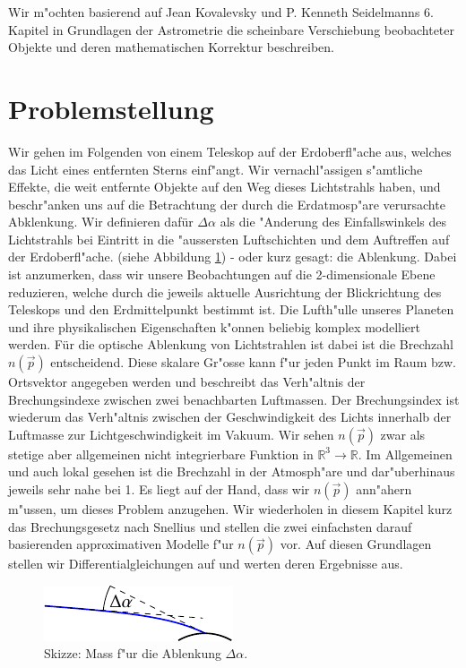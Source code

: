 \begin{refsection}
Wir m"ochten basierend auf Jean Kovalevsky und P. Kenneth Seidelmanns 6. Kapitel in Grundlagen der Astrometrie \cite[s. 121ff]{licht:astrometry} die scheinbare Verschiebung beobachteter Objekte und deren mathematischen Korrektur beschreiben. 

\section{Problemstellung}

Wir gehen im Folgenden von einem Teleskop auf der Erdoberfl"ache aus, welches das Licht eines entfernten Sterns einf"angt. 
Wir vernachl"assigen s"amtliche Effekte, die weit entfernte Objekte auf den Weg dieses Lichtstrahls haben, und beschr"anken uns auf die Betrachtung der durch die Erdatmosp"are verursachte Abklenkung.
Wir definieren dafür $\Delta \alpha$ als die "Anderung des Einfallswinkels des Lichtstrahls bei Eintritt in die "aussersten Luftschichten und dem Auftreffen auf der Erdoberfl"ache. (siehe Abbildung \ref{fig:skizze_mass}) - oder kurz gesagt: die Ablenkung.
Dabei ist anzumerken, dass wir unsere Beobachtungen auf die 2-dimensionale Ebene reduzieren, welche durch die jeweils aktuelle Ausrichtung der Blickrichtung des Teleskops und den Erdmittelpunkt bestimmt ist.
Die Lufth"ulle unseres Planeten und ihre physikalischen Eigenschaften k"onnen beliebig komplex modelliert werden. 
Für die optische Ablenkung von Lichtstrahlen ist dabei ist die Brechzahl $n(\vec{p})$ entscheidend. 
Diese  skalare Gr"osse kann f"ur jeden Punkt im Raum bzw. Ortsvektor angegeben werden und beschreibt das Verh"altnis der Brechungsindexe zwischen zwei benachbarten Luftmassen.
Der Brechungsindex ist wiederum das Verh"altnis zwischen der Geschwindigkeit des Lichts innerhalb der Luftmasse zur Lichtgeschwindigkeit im Vakuum. 
Wir sehen $n(\vec{p})$ zwar als stetige aber allgemeinen nicht integrierbare Funktion in $ \mathbb{R}^3 \rightarrow \mathbb{R}$.
Im Allgemeinen und auch lokal gesehen ist die Brechzahl in der Atmosph"are und dar"uberhinaus jeweils sehr nahe bei 1.
Es liegt auf der Hand, dass wir $n(\vec{p})$ ann"ahern m"ussen, um dieses Problem anzugehen. 
Wir wiederholen in diesem Kapitel kurz das Brechungsgesetz nach Snellius und stellen die zwei einfachsten darauf basierenden approximativen Modelle f"ur $n(\vec{p})$ vor. 
Auf diesen Grundlagen stellen wir Differentialgleichungen auf und werten deren Ergebnisse aus.

\begin{figure}
  \centering
  \includegraphics{licht/standalone/fig_delta_alpha.pdf}
  \caption{Skizze: Mass f"ur die Ablenkung $\Delta \alpha$. \label{fig:skizze_mass}}
\end{figure}


\end{refsection}
